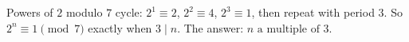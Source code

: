 Powers of $2$ modulo $7$ cycle: $2^1\equiv2$, $2^2\equiv4$, $2^3\equiv1$, then repeat with period $3$. So $2^n\equiv1\pmod7$ exactly when $3\mid n$. The answer: $\boxed{n\text{ a multiple of }3}$.
